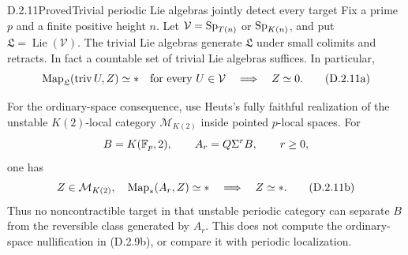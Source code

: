 \begin{claim}{D.2.11}{Proved}{Trivial periodic Lie algebras jointly detect every target}
Fix a prime $p$ and a finite positive height $n$. Let
$\mathcal V=\mathrm{Sp}_{T(n)}$ or $\mathrm{Sp}_{K(n)}$, and put
$\mathfrak L=\operatorname{Lie}(\mathcal V)$.
The trivial Lie algebras generate $\mathfrak L$ under small
colimits and retracts. In fact a countable set of trivial Lie
algebras suffices. In particular,
\[
 \operatorname{Map}_{\mathfrak L}(\operatorname{triv}U,Z)\simeq *
 \quad\hbox{for every }U\in\mathcal V
 \quad\Longrightarrow\quad Z\simeq0.
 \tag{D.2.11a}
\]

For the ordinary-space consequence, use Heuts's fully faithful
realization of the unstable $K(2)$-local category
$\mathcal M_{K(2)}$ inside pointed $p$-local spaces. For
\[
 B=K(\mathbb F_p,2),\qquad A_r=Q\Sigma^rB,\qquad r\geq0,
\]
one has
\[
 Z\in\mathcal M_{K(2)},\quad
 \operatorname{Map}_*(A_r,Z)\simeq *
 \quad\Longrightarrow\quad Z\simeq *.
 \tag{D.2.11b}
\]
Thus no noncontractible target in that unstable periodic category
can separate $B$ from the reversible class generated by $A_r$.
This does not compute the ordinary-space nullification in
\textup{(D.2.9b)}, or compare it with periodic localization.
\end{claim}
